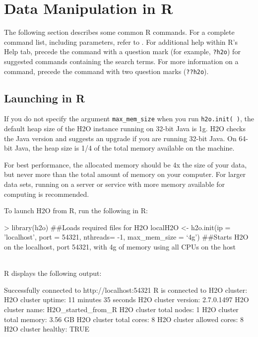 \documentclass[11pt]{article}
\begin{document}
\section{Data Manipulation in R}

The following section describes some common R commands. For a complete command list, including parameters, refer to .
For additional help within R's Help tab, precede the command with a question mark (for example, {\texttt{?h2o}}) for suggested commands containing the search terms. For more information on a command, precede the command with two question marks ({\texttt{??h2o}}). 

\subsection{Launching in R}

If you do not specify the argument {\texttt{max\_mem\_size}} when you run {\texttt{h2o.init( )}}, the default heap size of the H2O instance running on 32-bit Java is 1g. H2O checks the Java version and suggests an upgrade if you are running 32-bit Java. On 64-bit Java, the heap size is 1/4 of the total memory available on the machine. 

For best performance, the allocated memory should be 4x the size of your data, but never more than the total amount of memory on your computer. For larger data sets, running on a server or service with more memory available for computing is recommended.

To launch H2O from R, run the following in R:
\begin{spverbatim}
> library(h2o) ##Loads required files for H2O
localH2O <- h2o.init(ip = 'localhost', port = 54321, nthreads= -1, max_mem_size = ‘4g') ##Starts H2O on the localhost, port 54321, with 4g of memory using all CPUs on the host  \end{spverbatim} 
\\
R displays the following output: 
\begin{spverbatim}
Successfully connected to http://localhost:54321
       R is connected to H2O cluster:
   H2O cluster uptime:         11 minutes 35 seconds
   H2O cluster version:        2.7.0.1497
   H2O cluster name:           H2O_started_from_R
   H2O cluster total nodes:    1
   H2O cluster total memory:   3.56 GB
   H2O cluster total cores:    8
   H2O cluster allowed cores:  8
   H2O cluster healthy:        TRUE
\end{spverbatim}
\end{document}
